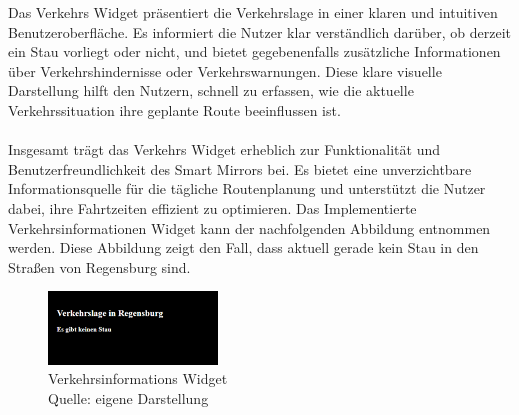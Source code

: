 \noindent
Das Verkehrs Widget präsentiert die Verkehrslage in einer klaren und intuitiven Benutzeroberfläche. Es informiert die Nutzer klar verständlich darüber, ob derzeit ein Stau vorliegt oder nicht, und bietet gegebenenfalls zusätzliche Informationen über Verkehrshindernisse oder Verkehrswarnungen. Diese klare visuelle Darstellung hilft den Nutzern, schnell zu erfassen, wie die aktuelle Verkehrssituation ihre geplante Route beeinflussen ist. \\ \\
\noindent
Insgesamt trägt das Verkehrs Widget erheblich zur Funktionalität und Benutzerfreundlichkeit des Smart Mirrors bei. Es bietet eine unverzichtbare Informationsquelle für die tägliche Routenplanung und unterstützt die Nutzer dabei, ihre Fahrtzeiten effizient zu optimieren. Das Implementierte Verkehrsinformationen Widget kann der nachfolgenden Abbildung entnommen werden. Diese Abbildung zeigt den Fall, dass aktuell gerade kein Stau  in den Straßen von Regensburg sind.

\begin{figure}[h]
    \centering
    \includegraphics[width=0.4\textwidth]{pictures/traffic_widget.png}
  \captionsetup{justification=centering, labelformat=simple, singlelinecheck=false}
    \caption{Verkehrsinformations Widget\\ Quelle: eigene Darstellung}
\end{figure}

